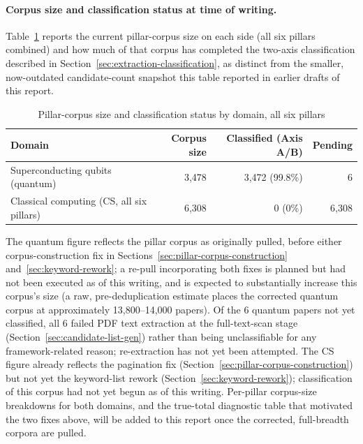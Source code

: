 \documentclass[11pt]{article}
\begin{document}
\paragraph{Corpus size and classification status at time of writing.}
\label{sec:corpus-size}

Table~\ref{tab:corpus-stats} reports the current pillar-corpus size on each side (all
six pillars combined) and how much of that corpus has completed the two-axis
classification described in Section~\ref{sec:extraction-classification}, as distinct
from the smaller, now-outdated candidate-count snapshot this table reported in earlier
drafts of this report.

\begin{table}[htbp]
\centering
\caption{Pillar-corpus size and classification status by domain, all six pillars}
\label{tab:corpus-stats}
\begin{tabular}{@{}l r r r@{}}
\toprule
Domain & Corpus size & Classified (Axis A/B) & Pending \\
\midrule
Superconducting qubits (quantum) & 3{,}478 & 3{,}472 (99.8\%) & 6 \\
Classical computing (CS, all six pillars) & 6{,}308 & 0 (0\%) & 6{,}308 \\
\bottomrule
\end{tabular}

\vspace{2mm}
\raggedright\footnotesize
The quantum figure reflects the pillar corpus as originally pulled, before either
corpus-construction fix in Sections~\ref{sec:pillar-corpus-construction}
and~\ref{sec:keyword-rework}; a re-pull incorporating both fixes is planned but had not
been executed as of this writing, and is expected to substantially increase this
corpus's size (a raw, pre-deduplication estimate places the corrected quantum corpus
at approximately 13{,}800--14{,}000 papers). Of the 6 quantum papers not yet
classified, all 6 failed PDF text extraction at the full-text-scan stage
(Section~\ref{sec:candidate-list-gen}) rather than being unclassifiable for any
framework-related reason; re-extraction has not yet been attempted. The CS figure
already reflects the pagination fix (Section~\ref{sec:pillar-corpus-construction}) but
not yet the keyword-list rework (Section~\ref{sec:keyword-rework}); classification of
this corpus had not yet begun as of this writing. Per-pillar corpus-size breakdowns for
both domains, and the true-total diagnostic table that motivated the two fixes above,
will be added to this report once the corrected, full-breadth corpora are pulled.

\end{table}
\end{document}
